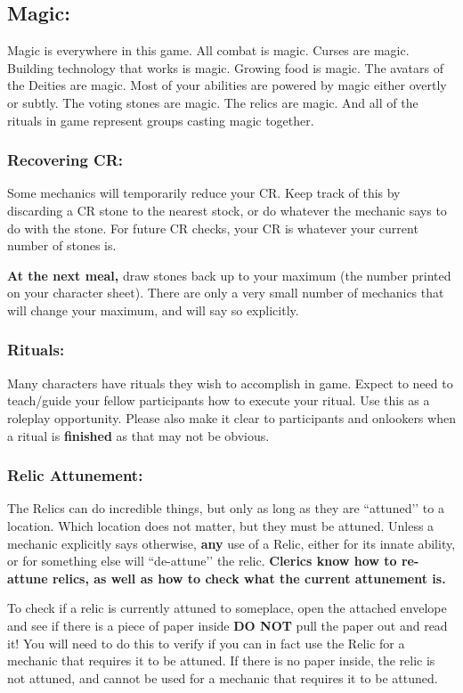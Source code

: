 \documentclass[sheet]{GL2020}
\begin{document}
\subsection{Magic:}
{Magic is everywhere in this game. All combat is magic. Curses are magic. Building technology that works is magic. Growing food is magic. The avatars of the Deities are magic. Most of your abilities are powered by magic either overtly or subtly. The voting stones are magic. The relics are magic. And all of the rituals in game represent groups casting magic together.

\subsubsection{Recovering CR:}
Some mechanics will temporarily reduce your CR. Keep track of this by discarding a CR stone to the nearest stock, or do whatever the mechanic says to do with the stone. For future CR checks, your CR is whatever your current number of stones is.

\textbf{At the next meal,} draw stones back up to your maximum (the number printed on your character sheet). There are only a very small number of mechanics that will change your maximum, and will say so explicitly.

\subsubsection{Rituals:}
Many characters have rituals they wish to accomplish in game. Expect to need to teach/guide your fellow participants how to execute your ritual. Use this as a roleplay opportunity. Please also make it clear to participants and onlookers when a ritual is \textbf{finished} as that may not be obvious.

\subsubsection{Relic Attunement:}
The Relics can do incredible things, but only as long as they are ``attuned’’ to a location. Which location does not matter, but they must be attuned. Unless a mechanic explicitly says otherwise, \textbf{any} use of a Relic, either for its innate ability, or for something else will ``de-attune’’ the relic. \textbf{Clerics know how to re-attune relics, as well as how to check what the current attunement is.}

To check if a relic is currently attuned to someplace, open the attached envelope and see if there is a piece of paper inside \textbf{DO NOT} pull the paper out and read it! You will need to do this to verify if you can in fact use the Relic for a mechanic that requires it to be attuned. If there is no paper inside, the relic is not attuned, and cannot be used for a mechanic that requires it to be attuned.

}
\end{document}
